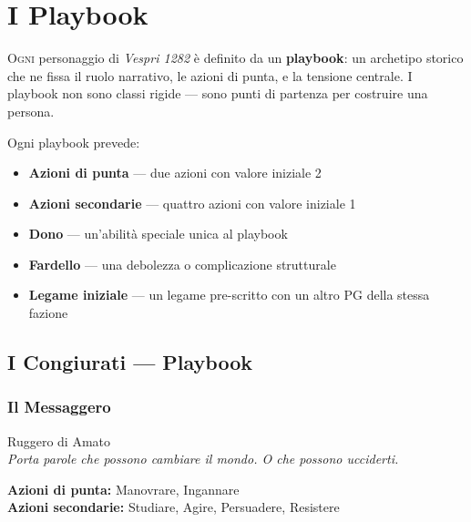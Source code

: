 
\chapter{I Playbook}

\lettrine[lines=3]{O}{gni} personaggio di \textit{Vespri 1282} è definito
da un \textbf{playbook}: un archetipo storico che ne fissa il ruolo
narrativo, le azioni di punta, e la tensione centrale. I playbook non
sono classi rigide — sono punti di partenza per costruire una persona.

Ogni playbook prevede:
\begin{itemize}[nosep]
  \item \textbf{Azioni di punta} — due azioni con valore iniziale 2
  \item \textbf{Azioni secondarie} — quattro azioni con valore iniziale 1
  \item \textbf{Dono} — un'abilità speciale unica al playbook
  \item \textbf{Fardello} — una debolezza o complicazione strutturale
  \item \textbf{Legame iniziale} — un legame pre-scritto con un altro PG
    della stessa fazione
\end{itemize}

\secsep

\section{I Congiurati — Playbook}

\subsection{Il Messaggero}
{\cinzel\footnotesize\color{grigionote} Ruggero di Amato}\\
\textit{Porta parole che possono cambiare il mondo. O che possono
ucciderti.}

\textbf{Azioni di punta:} Manovrare, Ingannare\\
\textbf{Azioni secondarie:} Studiare, Agire, Persuadere, Resistere

